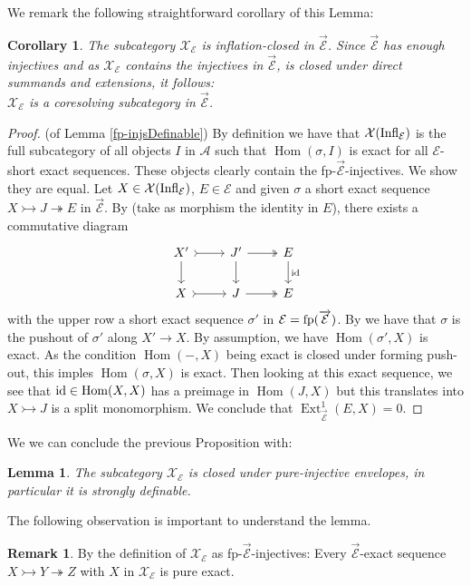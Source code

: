 \documentclass[11pt,a4paper]{amsart}
\theoremstyle{plain}
\newtheorem{lem}[thm]{Lemma}
\newtheorem{cor}[thm]{Corollary}
\theoremstyle{definition}
\newtheorem{rem}[thm]{Remark}
\DeclareMathOperator{\Hom}{Hom}
\DeclareMathOperator{\Ext}{Ext}
\newcommand{\defl}{\twoheadrightarrow}
\newcommand{\infl}{\rightarrowtail}
\newcommand{\mcA}{\mathcal{A}}
\newcommand{\mcE}{\mathcal{E}}
\newcommand{\mcX}{\mathcal{X}}
\begin{document}
We remark the following straightforward corollary of this Lemma: 
\begin{cor}
The subcategory $\mcX_{\mcE}$ is inflation-closed in $\overrightarrow{\mcE}$. Since $\overrightarrow{\mcE}$ has enough injectives and as $\mcX_{\mcE}$ contains the injectives in $\overrightarrow{\mcE}$, is closed under direct summands and extensions, it follows:\\
$\mcX_{\mcE}$ is a coresolving subcategory in $\overrightarrow{\mcE}$.
\end{cor}



\begin{proof} (of Lemma \ref{fp-injsDefinable}) 
By definition we have that $\mcX ({\rm Infl}_{\mcE})$ is the full subcategory of all objects $I$ in $\mcA$ such that $\Hom (\sigma , I)$ is exact for all $\mcE$-short exact sequences. These objects clearly contain the fp-$\overrightarrow{\mcE}$-injectives. We show they are equal. Let $X\in \mcX({\rm Infl}_{\mcE})$, $E\in \mcE$ and given $\sigma$ a short exact sequence 
$X\infl J \defl E$ in $\overrightarrow{\mcE}$. By \cite[Lem 1.5]{P-locCoh} (take as morphism the identity in $E$), there exists a commutative diagram 
\[
\begin{tikzcd}
X' \arrow[r, tail] \arrow[d] & J' \arrow[r, two heads] \arrow[d] & E \arrow[d, "\rm id"] \\
X \arrow[r, tail]            & J \arrow[r, two heads]            & E                    
\end{tikzcd}
\]
with the upper row a short exact sequence $\sigma'$ in $\mcE={\rm fp}(\overrightarrow{\mcE})$. By \cite[Prop 2.12]{Bue} we have that $\sigma$ is the pushout of $\sigma'$ along $X'\to X$. By assumption, we have $\Hom (\sigma', X)$ is exact. As the condition $\Hom (-,X)$ being exact is closed under forming push-out, this imples $\Hom (\sigma , X)$ is exact. Then looking at this exact sequence, we see that ${\rm id} \in \Hom (X,X)$ has a preimage in $\Hom (J,X)$ but this translates into $X\infl J$ is a split monomorphism. We conclude that $\Ext^1_{\overrightarrow{\mcE}}(E,X)=0$.   
\end{proof}

We we can conclude the previous Proposition with: 
\begin{lem} \label{PI-envelopes}
The subcategory $\mcX_{\mcE}$ is closed under pure-injective envelopes, in particular it is strongly definable.      
\end{lem}

The following observation is important to understand the lemma.
\begin{rem} \label{key}
By the definition of $\mcX_{\mcE}$ as fp-$\overrightarrow{\mcE}$-injectives: Every $\overrightarrow{\mcE}$-exact sequence $X \infl Y \defl Z$ with $X$ in $\mcX_{\mcE}$ is pure exact.    
\end{rem}
\end{document}
